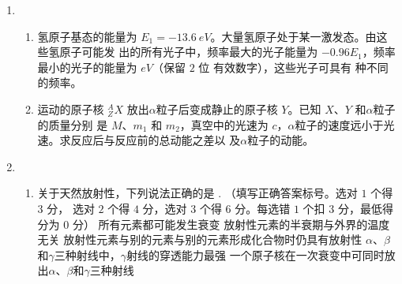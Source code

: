 \begin{enumerate}
\item 
{}
\begin{enumerate}
	\item
氢原子基态的能量为 $ E_{1} =-13.6 \ eV $。大量氢原子处于某一激发态。由这些氢原子可能发
出的所有光子中，频率最大的光子能量为 $ -0.96 E_{1} $，频率最小的光子的能量为
 \underlinegap 
$ eV $（保留 $ 2 $ 位
有效数字），这些光子可具有
 \underlinegap 
种不同的频率。




\item 
运动的原子核 $ ^{A}_{Z}X $ 放出$ \alpha $粒子后变成静止的原子核 $ Y $。已知 $ X $、$ Y $ 和$ \alpha $粒子的质量分别
是 $ M $、$ m_{1} $ 和 $ m_{2} $，真空中的光速为 $ c $，$ \alpha $粒子的速度远小于光速。求反应后与反应前的总动能之差以
及$ \alpha $粒子的动能。



	
\end{enumerate}


\item 
{}
\begin{enumerate}
	\item
关于天然放射性，下列说法正确的是 \underlinegap .
（填写正确答案标号。选对 $ 1 $ 个得 $ 3 $ 分，
选对 $ 2 $ 个得 $ 4 $ 分，选对 $ 3 $ 个得 $ 6 $ 分。每选错 $ 1 $ 个扣 $ 3 $ 分，最低得分为 $ 0 $ 分）
\fivechoices
{所有元素都可能发生衰变}
{放射性元素的半衰期与外界的温度无关}
{放射性元素与别的元素与别的元素形成化合物时仍具有放射性}
{$ \alpha $、$ \beta $和$ \gamma $三种射线中，$ \gamma $射线的穿透能力最强}
{一个原子核在一次衰变中可同时放出$ \alpha $、$ \beta $和$ \gamma $三种射线}





\end{enumerate}
\end{enumerate}
